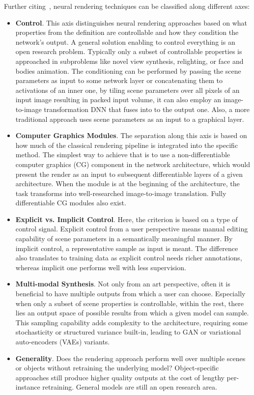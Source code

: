 Further citing~\citet{SOTARendering}, neural rendering techniques can be classified along different axes:
\begin{itemize}
    \item \textbf{Control}. This axis distinguishes neural rendering approaches based on
    what properties from the definition are controllable and how they condition
    the network's output. A general solution enabling to control everything is an open
    research problem. Typically only a subset of controllable properties is approached
    in subproblems like novel view synthesis, relighting, or face and bodies animation.
    The conditioning can be performed by passing the scene parameters as input to some network
    layer or concatenating them to activations of an inner one, by tiling scene parameters over
    all pixels of an input image resulting in packed input volume, it can also employ
    an image-to-image transformation DNN that fuses  into to the output one.
    Also, a more traditional approach uses scene parameters as an input to a graphical layer.
    \item \textbf{Computer Graphics Modules}. The separation along this axis is based on how much
    of the classical rendering pipeline is integrated into the specific method. The simplest way
    to achieve that is to use a non-differentiable computer graphics (CG) component in the network
    architecture, which would present the render as an input to subsequent differentiable layers of a given architecture.
    When the module is at the beginning of the architecture, the task transforms into
    well-researched image-to-image translation. Fully differentiable CG modules also exist.
    \item \textbf{Explicit vs. Implicit Control}. Here, the criterion is based on a type of
    control signal. Explicit control from a user perspective means manual editing capability
    of scene parameters in a semantically meaningful manner. By implicit control, a representative
    sample as input is meant. The difference also translates to training data as explicit control
    needs richer annotations, whereas implicit one performs well with less supervision.
    \item \textbf{Multi-modal Synthesis}. Not only from an art perspective, often it is beneficial to have
    multiple outputs from which a user can choose. Especially when only a subset of scene properties is
    controllable, within the rest, there lies an output space of possible results from which a given model
    can sample. This sampling capability adds complexity to the architecture, requiring some
    stochasticity or structured variance built-in, leading to GAN or variational auto-encoders (VAEs) variants.  %
    \item \textbf{Generality}. Does the rendering approach perform well over multiple
    scenes or objects without retraining the underlying model? Object-specific approaches
    still produce higher quality outputs at the cost of lengthy per-instance retraining. General models
    are still an open research area.
\end{itemize}

